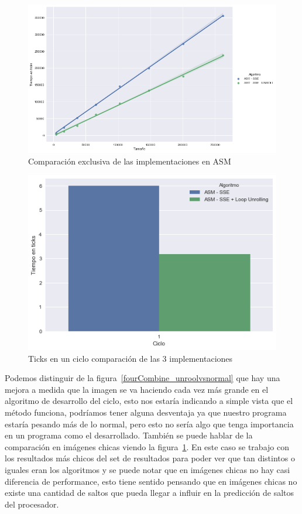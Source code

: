 \begin{figure}[H]
	\centering
	\includegraphics[scale=0.5]{img/fourCombine_UnrollvsNormal_asmOnly.png}
	\caption{Comparación exclusiva de las implementaciones en ASM}
	\label{fourCombine_unroolvsnormal_asmOnly}
\end{figure}

\begin{figure}[H]
	\centering
	\includegraphics[scale=0.5]{img/fourCombine_ticks_en_ciclo.png}
	\caption{Ticks en un ciclo comparación de las 3 implementaciones}
	\label{fourCombine_ticksciclo}
\end{figure}

Podemos distinguir de la figura~\ref{fourCombine_unroolvsnormal} que hay una mejora a medida que la imagen se va haciendo cada vez más grande en el algoritmo de desarrollo del ciclo, esto nos estaría indicando a simple vista que el método funciona, podríamos tener alguna desventaja ya que nuestro programa estaría pesando más de lo normal, pero esto no sería algo que tenga importancia en un programa como el desarrollado. También se puede hablar de la comparación en imágenes chicas viendo la figura~\ref{fourCombine_unroolvsnormal_asmOnly}. En este caso se trabajo con los resultados más chicos del set de resultados para poder ver que tan distintos o iguales eran los algoritmos y se puede notar que en imágenes chicas no hay casi diferencia de performance, esto tiene sentido pensando que en imágenes chicas no existe una cantidad de saltos que pueda llegar a influir en la predicción de saltos del procesador.

